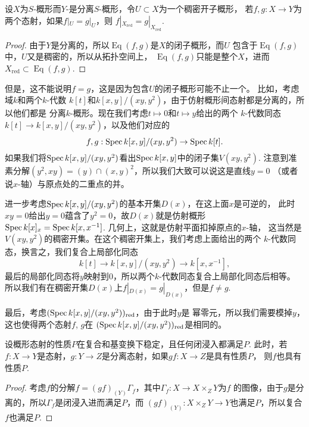 \begin{pro}
	设$X$为$S$-概形而$Y$-是分离$S$-概形，令$U\subset X$为一个稠密开子概形，
	若$f,g:X\to Y$为两个态射，如果$f|_U=g|_U$，则
	$f|_{X_{\operatorname{red}}}=g|_{X_{\operatorname{red}}}$.
\end{pro}

\begin{proof}
	由于$Y$是分离的，所以$\operatorname{Eq}(f,g)$是$X$的闭子概形，而$U$
	包含于$\operatorname{Eq}(f,g)$中，$U$又是稠密的，所以从拓扑空间上，
	$\operatorname{Eq}(f,g)$只能是整个$X$，进而
	$X_{\operatorname{red}}\subset\operatorname{Eq}(f,g)$.
\end{proof}

但是，这不能说明$f=g$，这是因为包含$U$的闭子概形可能不止一个。
比如，考虑域$k$和两个$k$-代数
$k[t]$和$k[x,y]/(xy,y^2)$，由于仿射概形间态射都是分离的，所以他们都是
分离$k$-概形。现在我们考虑$t\mapsto 0$和$t\mapsto y$给出的两个
$k$-代数同态$k[t]\to k[x,y]/(xy,y^2)$，以及他们对应的
\[
	f,g:\operatorname{Spec} k[x,y]/(xy,y^2)\to \operatorname{Spec} k[t].
\]
如果我们将$\operatorname{Spec} k[x,y]/(xy,y^2)$看出$\operatorname{Spec} k[x,y]$中的闭子集$V(xy,y^2)$. 
注意到准素分解$(y^2,xy)=(y)\cap (x,y)^2$，所以我们大致可以说这是直线$y=0$
（或者说$x$-轴）与原点处的二重点的并。

进一步考虑$\operatorname{Spec} k[x,y]/(xy,y^2)$的基本开集$D(x)$，在这上面$x$是可逆的，
此时$xy=0$给出$y=0$蕴含了$y^2=0$，故$D(x)$就是仿射概形
$\operatorname{Spec} k[x]_x=\operatorname{Spec} k[x,x^{-1}]$. 几何上，这就是仿射平面扣掉原点的$x$-轴，
这当然是$V(xy,y^2)$的稠密开集。在这个稠密开集上，我们考虑上面给出的两个
$k$-代数同态，换言之，我们复合上局部化同态
\[
	k[t]\to k[x,y]/(xy,y^2)\to k[x,x^{-1}],
\]
最后的局部化同态将$y$映射到$0$，所以两个$k$-代数同态复合上局部化同态后相等。
所以我们有在稠密开集$D(x)$上$f|_{D(x)}=g|_{D(x)}$，但是$f\neq g$.

最后，考虑$(\operatorname{Spec} k[x,y]/(xy,y^2))_{\text{red}}$，由于此时$y$是
幂零元，所以我们需要模掉$y$，这也使得两个态射$f$, $g$在
$(\operatorname{Spec} k[x,y]/(xy,y^2))_{\text{red}}$是相同的。

\begin{pro}
	设概形态射的性质$P$在复合和基变换下稳定，且任何闭浸入都满足$P$. 此时，若
	$f:X\to Y$是态射，$g:Y\to Z$是分离态射，如果$gf:X\to Z$是具有性质$P$，
	则$f$也具有性质$P$.
\end{pro}

\begin{proof}
	考虑$f$的分解$f=(gf)_{(Y)}\Gamma_f$，其中$\Gamma_f:X\to X\times_Z Y$为$f$
	的图像，由于$g$是分离的，所以$\Gamma_f$是闭浸入进而满足$P$，而
	$(gf)_{(Y)}:X\times_Z Y\to Y$也满足$P$，所以复合$f$也满足$P$.
\end{proof}

